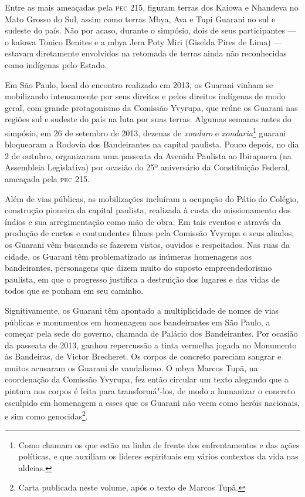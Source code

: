 Entre as mais ameaçadas pela \textsc{pec} 215, figuram terras dos Kaiowa e
Nhandeva no Mato Grosso do Sul, assim como terras Mbya, Ava e Tupi
Guarani no sul e sudeste do país. Não por acaso, durante o simpósio,
dois de seus participantes --- o kaiowa Tonico Benites e a mbya Jera Poty
Miri (Giselda Pires de Lima) --- estavam diretamente envolvidos na
retomada de terras ainda não reconhecidas como indígenas pelo Estado. 

Em São Paulo, local do encontro realizado em 2013, os Guarani vinham se
mobilizando intensamente por seus direitos e pelos direitos indígenas
de modo geral, com grande protagonismo da Comissão Yvyrupa, que reúne
os Guarani nas regiões sul e sudeste do país na luta por suas terras.
Algumas semanas antes do simpósio, em 26 de setembro de 2013, dezenas
de \emph{xondaro} e \emph{xondaria}\footnote{Como chamam os que estão na linha de
frente dos enfrentamentos e das ações políticas, e que auxiliam os
líderes espirituais em vários contextos da vida nas aldeias.} guarani
bloquearam a Rodovia dos Bandeirantes na capital paulista. Pouco
depois, no dia 2 de outubro, organizaram uma passeata da Avenida
Paulista ao Ibirapuera (na Assembleia Legislativa) por ocasião do 25º
aniversário da Constituição Federal, ameaçada pela \textsc{pec} 215. 

Além de vias públicas, as mobilizações incluíram a ocupação do Pátio do
Colégio, construção pioneira da capital paulista, realizada à custa do
missionamento dos índios e sua arregimentação como mão de obra. Em tais
eventos e através da produção de curtos e contundentes filmes pela
Comissão Yvyrupa e seus aliados, os Guarani vêm buscando se fazerem
vistos, ouvidos e respeitados. Nas ruas da cidade, os Guarani têm
problematizado as inúmeras homenagens aos bandeirantes, personagens que
dizem muito do suposto empreendedorismo paulista, em que o progresso
justifica a destruição dos lugares e das vidas de todos que se ponham
em seu caminho.

Signitivamente, os Guarani têm apontado a multiplicidade de nomes de
vias públicas e monumentos em homenagem aos bandeirantes em São Paulo,
a começar pela sede do governo, chamada de Palácio dos Bandeirantes.
Por ocasião da passeata de 2013, ganhou repercussão a tinta vermelha
jogada no Monumento às Bandeiras, de Victor Brecheret. Os corpos de
concreto pareciam sangrar e muitos acusaram os Guarani de vandalismo. O
mbya Marcos Tupã, na coordenação da Comissão Yvyrupa, fez então
circular um texto alegando que a pintura nos corpos é feita para
transformá"-los, de modo a humanizar o concreto esculpido em homenagem a
esses que os Guarani não veem como heróis nacionais, e sim como
genocidas\footnote{Carta publicada neste volume, após o texto de
Marcos Tupã.}.

